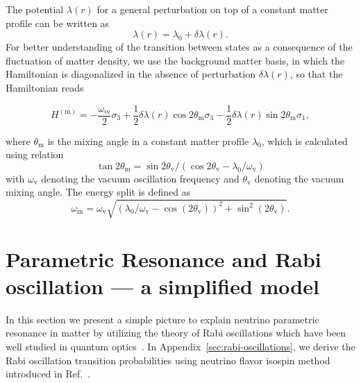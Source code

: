\documentclass[%
reprint,
 amsmath,amssymb,
 aps,
]{revtex4-1}
\begin{document}
The potential $\lambda(r)$ for a general perturbation on top of a constant matter profile can be written as
\begin{equation}
    \lambda(r) = \lambda_0 + \delta \lambda(r).
    \label{eq-general-matter-profile}
\end{equation}
For better understanding of the transition between states as a consequence of the fluctuation of matter density, we use the background matter basis, in which the Hamiltonian is diagonalized in the absence of perturbation $\delta\lambda(r)$, so that the Hamiltonian reads
\begin{widetext}
\begin{equation}
    H^{(\mathrm{m})} = -\frac{\omega_m}{2} \sigma_3 + \frac{1}{2} \delta\lambda(r) \cos 2\theta_{\mathrm m} \sigma_3 
     - \frac{1}{2} \delta\lambda(r) \sin 2\theta_{\mathrm m} \sigma_1,
    \label{eq-hamiltonian-bg-matter-basis-general}
\end{equation}
\end{widetext}
where $\theta_{\mathrm m}$ is the mixing angle in a constant matter profile $\lambda_0$, which is calculated using relation
\begin{equation*}
\tan 2\theta_{\mathrm{m}}=\sin 2\theta_{\mathrm v}/\left( \cos 2\theta_{\mathrm v} - \lambda_0/\omega_{\mathrm v} \right)
\end{equation*}
with $\omega_{\mathrm v}$ denoting the vacuum oscillation frequency and $\theta_{\mathrm v}$ denoting the vacuum mixing angle. The energy split is defined as
\begin{equation}
\omega_{\mathrm{m}} = \omega_{\mathrm{v}} \sqrt{ ( \lambda_0/\omega_{\mathrm{v}} - \cos (2\theta_{\mathrm{v}}) )^2 + \sin^2(2\theta_{\mathrm{v}}) }.
\end{equation}





\section{\label{sec:simple}Parametric Resonance and Rabi oscillation --- a simplified model}%


In this section we present a simple picture to explain neutrino parametric resonance in matter by utilizing the theory of Rabi oscillations which have been well studied in quantum optics~\cite{Boyd2008}. In Appendix~\ref{sec:rabi-oscillations}, we derive the Rabi oscillation transition probabilities using neutrino flavor isospin method introduced in Ref.~.
\end{document}
